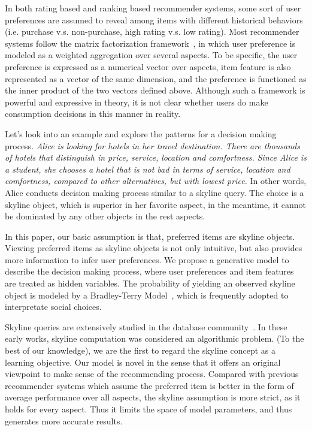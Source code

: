 \documentclass[sigconf]{acmart}
\begin{document}
In both rating based and ranking based recommender systems, some sort of user preferences are assumed to reveal among items with different historical behaviors (i.e. purchase v.s. non-purchase, high rating v.s. low rating). Most recommender systems follow the matrix factorization framework~\cite{Koren2009Matrix}, in which user preference is modeled as a weighted aggregation over several aspects. To be specific, the user preference is expressed as a numerical vector over aspects, item feature is also represented as a vector of the same dimension, and the preference is functioned as the inner product of the two vectors defined above. Although such a framework is powerful and expressive in theory, it is not clear whether users do make consumption decisions in this manner in reality.  

Let's look into an example and explore the patterns for a decision making process. \textit{Alice is looking for hotels in her travel destination. There are thousands of hotels that distinguish in price, service, location and comfortness. Since Alice is a student, she chooses a hotel that is not bad in terms of service, location and comfortness, compared to other alternatives, but with lowest price.} In other words, Alice conducts decision making process similar to a skyline query. The choice is a skyline object, which is superior in her favorite aspect, in the meantime, it cannot be dominated by any other objects in the rest aspects. 

In this paper, our basic assumption is that, preferred items are skyline objects. Viewing preferred items as skyline objects is not only intuitive, but also provides more information to infer user preferences. We propose a generative model to describe the decision making process, where user preferences and item features are treated as hidden variables. The probability of yielding an observed skyline object is modeled by a Bradley-Terry Model~\cite{Hunter2004MM}, which is frequently adopted to interpretate social choices. 

Skyline queries are extensively studied in the database community~\cite{Pei2007Probabilistic}. In these early works, skyline computation was considered an algorithmic problem. (To the best of our knowledge), we are the first to regard the skyline concept as a learning objective. Our model is novel in the sense that it offers an original viewpoint to make sense of the recommending process. Compared with previous recommender systems which assume the preferred item is better in the form of average performance over all aspects, the skyline assumption is more strict, as it holds for every aspect. Thus it limits the space of model parameters, and thus generates more accurate results. 
\end{document}
